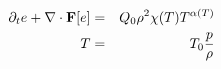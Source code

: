 \begin{eqnarray*}
  \partial_t e + \nabla\cdot {\bf F}[e]&=&Q_0 \rho^2 \chi(T) T^{\alpha(T)} \\
                                  T&=&T_0 \frac{p}{\rho}
\end{eqnarray*}

